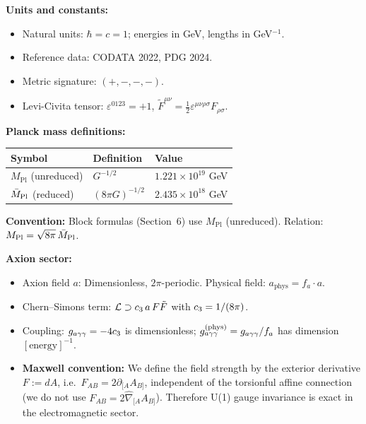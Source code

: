 \begin{tcolorbox}[colback=yellow!5, colframe=yellow!60!black, 
    title={\textbf{Conventions: Units, Masses, and Normalizations}}, fonttitle=\bfseries]

\textbf{Units and constants:}
\begin{itemize}[leftmargin=1.5em, topsep=2pt, itemsep=1pt]
    \item Natural units: $\hbar = c = 1$; energies in GeV, lengths in GeV$^{-1}$.
    \item Reference data: CODATA 2022, PDG 2024.
    \item Metric signature: $(+,-,-,-)$.
    \item Levi-Civita tensor: $\varepsilon^{0123} = +1$, $\tilde{F}^{\mu\nu} = \frac{1}{2}\varepsilon^{\mu\nu\rho\sigma}F_{\rho\sigma}$.
\end{itemize}

\textbf{Planck mass definitions:}
\begin{center}
\begin{tabular}{@{}lll@{}}
\toprule
\textbf{Symbol} & \textbf{Definition} & \textbf{Value}\\
\midrule
$M_{\mathrm{Pl}}$ (unreduced) & $G^{-1/2}$ & $1.221 \times 10^{19}$ GeV\\
$\bar{M}_{\mathrm{Pl}}$ (reduced) & $(8\pi G)^{-1/2}$ & $2.435 \times 10^{18}$ GeV\\
\bottomrule
\end{tabular}
\end{center}
\textbf{Convention:} Block formulas (Section~6) use $M_{\mathrm{Pl}}$ (unreduced). 
Relation: $M_{\mathrm{Pl}} = \sqrt{8\pi}\,\bar{M}_{\mathrm{Pl}}$.

\textbf{Axion sector:}
\begin{itemize}[leftmargin=1.5em, topsep=2pt, itemsep=1pt]
    \item Axion field $a$: Dimensionless, $2\pi$-periodic. Physical field: $a_{\text{phys}} = f_a \cdot a$.
    \item Chern--Simons term: $\mathcal{L} \supset c_3\, a\, F\tilde{F}$ with $c_3 = 1/(8\pi)$.
    \item Coupling: $g_{a\gamma\gamma} = -4c_3$ is dimensionless; $g_{a\gamma\gamma}^{\text{(phys)}} = g_{a\gamma\gamma} / f_a$ has dimension $[\text{energy}]^{-1}$.
    \item \textbf{Maxwell convention:} We define the field strength by the exterior derivative $F := dA$, i.e.\ $F_{AB}=2\partial_{[A}A_{B]}$, independent of the torsionful affine connection (we do not use $F_{AB}=2\hat{\nabla}_{[A}A_{B]}$). Therefore U(1) gauge invariance is exact in the electromagnetic sector.
\end{itemize}
\end{tcolorbox}

